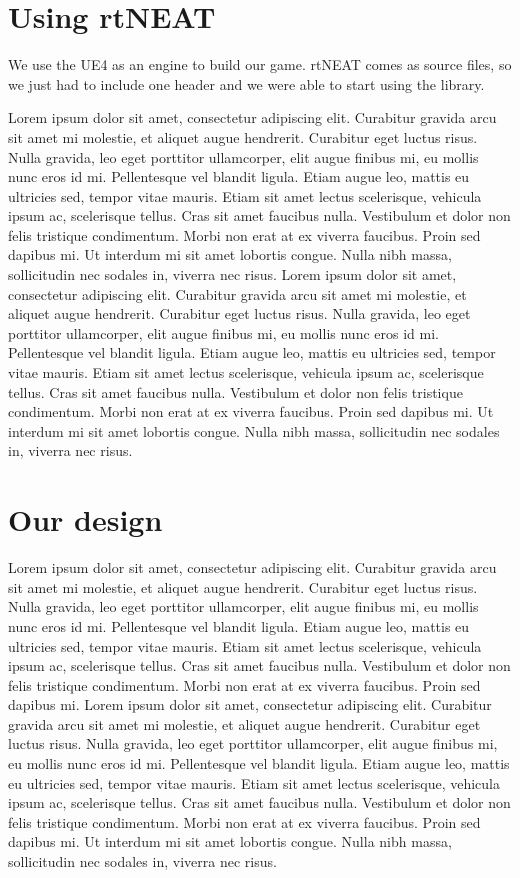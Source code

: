\documentclass[conference]{acmsiggraph}
\begin{document}
\section{Using rtNEAT}

We use the UE4 as an engine to build our game. rtNEAT comes as source files, so we just had to include one header and we were able to start using the library.

Lorem ipsum dolor sit amet, consectetur adipiscing elit. Curabitur gravida arcu sit amet mi molestie, et aliquet augue hendrerit. Curabitur eget luctus risus. Nulla gravida, leo eget porttitor ullamcorper, elit augue finibus mi, eu mollis nunc eros id mi. Pellentesque vel blandit ligula. Etiam augue leo, mattis eu ultricies sed, tempor vitae mauris. Etiam sit amet lectus scelerisque, vehicula ipsum ac, scelerisque tellus. Cras sit amet faucibus nulla. Vestibulum et dolor non felis tristique condimentum. Morbi non erat at ex viverra faucibus. Proin sed dapibus mi. Ut interdum mi sit amet lobortis congue. Nulla nibh massa, sollicitudin nec sodales in, viverra nec risus. Lorem ipsum dolor sit amet, consectetur adipiscing elit. Curabitur gravida arcu sit amet mi molestie, et aliquet augue hendrerit. Curabitur eget luctus risus. Nulla gravida, leo eget porttitor ullamcorper, elit augue finibus mi, eu mollis nunc eros id mi. Pellentesque vel blandit ligula. Etiam augue leo, mattis eu ultricies sed, tempor vitae mauris. Etiam sit amet lectus scelerisque, vehicula ipsum ac, scelerisque tellus. Cras sit amet faucibus nulla. Vestibulum et dolor non felis tristique condimentum. Morbi non erat at ex viverra faucibus. Proin sed dapibus mi. Ut interdum mi sit amet lobortis congue. Nulla nibh massa, sollicitudin nec sodales in, viverra nec risus.

\section{Our design}

Lorem ipsum dolor sit amet, consectetur adipiscing elit. Curabitur gravida arcu sit amet mi molestie, et aliquet augue hendrerit. Curabitur eget luctus risus. Nulla gravida, leo eget porttitor ullamcorper, elit augue finibus mi, eu mollis nunc eros id mi. Pellentesque vel blandit ligula. Etiam augue leo, mattis eu ultricies sed, tempor vitae mauris. Etiam sit amet lectus scelerisque, vehicula ipsum ac, scelerisque tellus. Cras sit amet faucibus nulla. Vestibulum et dolor non felis tristique condimentum. Morbi non erat at ex viverra faucibus. Proin sed dapibus mi.
Lorem ipsum dolor sit amet, consectetur adipiscing elit. Curabitur gravida arcu sit amet mi molestie, et aliquet augue hendrerit. Curabitur eget luctus risus. Nulla gravida, leo eget porttitor ullamcorper, elit augue finibus mi, eu mollis nunc eros id mi. Pellentesque vel blandit ligula. Etiam augue leo, mattis eu ultricies sed, tempor vitae mauris. Etiam sit amet lectus scelerisque, vehicula ipsum ac, scelerisque tellus. Cras sit amet faucibus nulla. Vestibulum et dolor non felis tristique condimentum. Morbi non erat at ex viverra faucibus. Proin sed dapibus mi. Ut interdum mi sit amet lobortis congue. Nulla nibh massa, sollicitudin nec sodales in, viverra nec risus.


\nocite{*}

\end{document}
